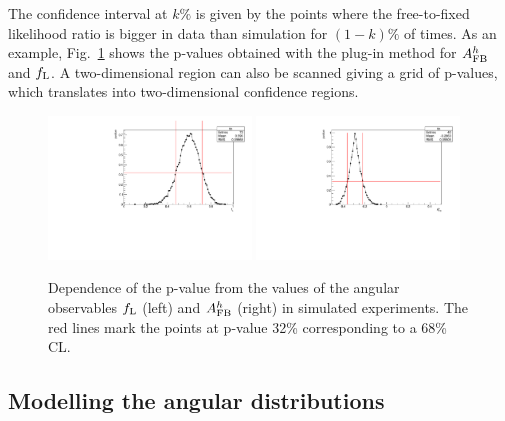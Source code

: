 The confidence interval at $k\%$ is given by the points where the free-to-fixed likelihood ratio is bigger in data than
simulation for $(1-k)\%$ of times. As an example, Fig.~\ref{fig:FCexample} shows the p-values obtained
with the plug-in method for $A_{\rm FB}^h$ and $f_{\rm L}$. A two-dimensional region 
can also be scanned giving a grid of p-values, which translates into two-dimensional confidence regions.
%
\begin{figure}[h!]
\centering
\includegraphics[width=0.48\textwidth]{Lmumu/figs/pvalue_fL_1500_2000.pdf}
\includegraphics[width=0.48\textwidth]{Lmumu/figs/pvalue_afbB_1500_2000.pdf}
\caption{ Dependence of the p-value from the values of the angular observables $f_{\rm L}$ (left) 
and $A_{\rm FB}^h$ (right) in simulated experiments. The red lines mark the points
at p-value 32\% corresponding to a 68\% CL.}
\label{fig:FCexample}
\end{figure}

\subsection{Modelling the angular distributions}
\label{sec:angfit}


